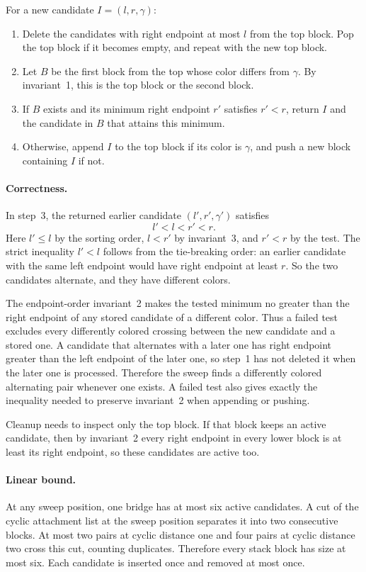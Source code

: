 \documentclass[11pt]{article}
\begin{document}
For a new candidate $I=(l,r,\gamma)$:
\begin{enumerate}[nosep]
\item Delete the candidates with right endpoint at most $l$ from the top block.
Pop the top block if it becomes empty, and repeat with the new top block.
\item Let $B$ be the first block from the top whose color differs from
$\gamma$. By invariant~1, this is the top block or the second block.
\item If $B$ exists and its minimum right endpoint $r'$ satisfies $r'<r$,
return $I$ and the candidate in $B$ that attains this minimum.
\item Otherwise, append $I$ to the top block if its color is $\gamma$, and
push a new block containing $I$ if not.
\end{enumerate}

\paragraph{Correctness.}
In step~3, the returned earlier candidate $(l',r',\gamma')$ satisfies
\begin{equation*}
l'<l<r'<r.
\end{equation*}
Here $l'\le l$ by the sorting order, $l<r'$ by invariant~3, and $r'<r$ by the
test. The strict inequality $l'<l$ follows from the tie-breaking order: an
earlier candidate with the same left endpoint would have right endpoint at
least $r$. So the two candidates alternate, and they have different colors.

The endpoint-order invariant~2 makes the tested minimum no greater than the
right endpoint of any stored candidate of a different color. Thus a failed
test excludes every differently colored crossing between the new candidate and
a stored one. A candidate that alternates with a later one has right endpoint
greater than the left endpoint of the later one, so step~1 has not deleted it
when the later one is processed. Therefore the sweep finds a differently
colored alternating pair whenever one exists. A failed test also gives exactly
the inequality needed to preserve invariant~2 when appending or pushing.

Cleanup needs to inspect only the top block. If that block keeps an active
candidate, then by invariant~2 every right endpoint in every lower block is at
least its right endpoint, so these candidates are active too.

\paragraph{Linear bound.}
At any sweep position, one bridge has at most six active candidates. A cut of
the cyclic attachment list at the sweep position separates it into two
consecutive blocks. At most two pairs at cyclic distance one and four pairs at
cyclic distance two cross this cut, counting duplicates. Therefore every stack
block has size at most six. Each candidate is inserted once and removed at most
once.
\end{document}
